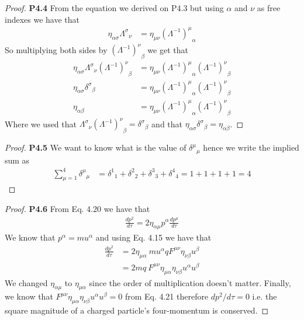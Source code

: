 \documentclass[11pt]{article}
\theoremstyle{definition}
\begin{document}
\begin{proof}{\textbf{P4.4}}
    From the equation we derived on P4.3 but using $\alpha$ and $\nu$ as free
    indexes we have that
    \begin{align*}
        \eta_{\alpha\sigma}  {\Lambda^\sigma}_\nu
        &= \eta_{\mu\nu} {(\Lambda^{-1})^\mu}_\alpha 
    \end{align*}
    So multiplying both sides by ${(\Lambda^{-1})^\nu}_\beta$ we get that
    \begin{align*}
        \eta_{\alpha\sigma}  {\Lambda^\sigma}_\nu {(\Lambda^{-1})^\nu}_\beta
        &= \eta_{\mu\nu} {(\Lambda^{-1})^\mu}_\alpha {(\Lambda^{-1})^\nu}_\beta\\
        \eta_{\alpha\sigma}  {\delta^\sigma}_\beta
        &= \eta_{\mu\nu} {(\Lambda^{-1})^\mu}_\alpha {(\Lambda^{-1})^\nu}_\beta\\
        \eta_{\alpha\beta}
        &= \eta_{\mu\nu} {(\Lambda^{-1})^\mu}_\alpha {(\Lambda^{-1})^\nu}_\beta
    \end{align*}
    Where we used that
    ${\Lambda^\sigma}_\nu {(\Lambda^{-1})^\nu}_\beta = {\delta^\sigma}_\beta$
    and that $\eta_{\alpha\sigma} {\delta^\sigma}_\beta = \eta_{\alpha\beta}$.
\end{proof}
\begin{proof}{\textbf{P4.5}}
    We want to know what is the value of ${\delta^\mu}_\mu$ hence we write the
    implied sum as
    \begin{align*}
        \sum_{\mu=1}^4 {\delta^\mu}_\mu &= {\delta^1}_1 + {\delta^2}_2 + {\delta^3}_3 + {\delta^4}_4
            = 1 + 1 + 1 + 1
            = 4
    \end{align*}
\end{proof}
\begin{proof}{\textbf{P4.6}}
    From Eq. 4.20 we have that
    \begin{align*}
        \frac{dp^2}{d\tau} = 2\eta_{\alpha\mu}p^{\alpha} \frac{dp^\mu}{d\tau}
    \end{align*}
    We know that $p^{\alpha} = m u^\alpha$ and using Eq. 4.15 we have that
    \begin{align*}
        \frac{dp^2}{d\tau}
        &= 2\eta_{\mu\alpha}~mu^\alpha qF^{\mu\nu}\eta_{\nu\beta}u^{\beta}\\
        &= 2mq~F^{\mu\nu}\eta_{\mu\alpha}\eta_{\nu\beta}u^\alpha u^{\beta}
    \end{align*}
    We changed $\eta_{\alpha\mu}$ to $\eta_{\mu\alpha}$ since the order
    of multiplication doesn't matter.
    Finally, we know that
    $F^{\mu\nu}\eta_{\mu\alpha}\eta_{\nu\beta}u^\alpha u^{\beta} = 0$
    from Eq. 4.21 therefore $dp^2/d\tau = 0$ i.e.
    the square magnitude of a charged particle's four-momentum is conserved.
\end{proof}
\end{document}
